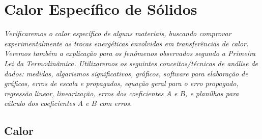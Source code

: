 \chapter{Calor Específico de Sólidos} %
\label{Chap:CalorEspecifico}        %

\begin{fullwidth}\it
Verificaremos o calor específico de alguns materiais, buscando comprovar experimentalmente as trocas energéticas envolvidas em transferências de calor. Veremos também a explicação para os fenômenos observados segundo a Primeira Lei da Termodinâmica. Utilizaremos os seguintes conceitos/técnicas de análise de dados: medidas, algarismos significativos, gráficos, software para elaboração de gráficos, erros de escala e propagados, equação geral para o erro propagado, regressão linear, linearização, erros dos coeficientes $A$ e $B$, e planílhas para cálculo dos coeficientes $A$ e $B$ com erros.
\end{fullwidth}

\section{Calor}






